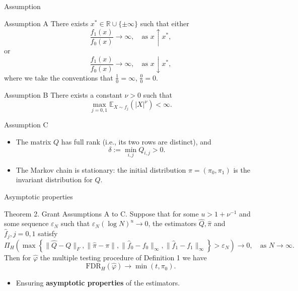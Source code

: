 \documentclass[10pt, aspectratio=169]{beamer}
\begin{document}
\begin{frame}{Assumption}
    \begin{assumpbox}{Assumption A}
        There exists \( x^* \in \mathbb{R} \cup \{\pm\infty\} \) such that either
        \[
        \frac{f_1(x)}{f_0(x)} \to \infty, \quad \text{as } x \uparrow x^*,
        \]
        or
        \[
        \frac{f_1(x)}{f_0(x)} \to \infty, \quad \text{as } x \downarrow x^*,
        \]
        where we take the conventions that \( \frac{1}{0} = \infty \), \( \frac{0}{0} = 0 \).
    \end{assumpbox}
\end{frame}
\begin{frame}
    \begin{assumpbox}{Assumption B}
        There exists a constant \( \nu > 0 \) such that
        \begin{equation*}
            \max_{j=0,1} \mathbb{E}_{X \sim f_j} (|X|^\nu) < \infty.
        \end{equation*}
    \end{assumpbox}
     \begin{assumpbox}{Assumption C}
        \begin{itemize}
            \item The matrix \( Q \) has full rank (i.e., its two rows are distinct), and 
            \[
            \delta := \min_{i,j} Q_{i,j} > 0.
            \]
            \item The Markov chain is stationary: the initial distribution \( \pi = (\pi_0, \pi_1) \) is the invariant distribution for \( Q \).
        \end{itemize}
    \end{assumpbox}  
\end{frame}
\begin{frame}{Asymptotic properties}
   \begin{mytheorembox}{Theorem 2.}
        Grant Assumptions A to C. Suppose that for some \( u > 1 + \nu^{-1} \) and some sequence
        \( \varepsilon_N \) such that \( \varepsilon_N (\log N)^u \to 0 \), the estimators \( \hat{Q}, \hat{\pi} \) and \( \hat{f}_j, j = 0,1 \) satisfy
        \[
        \Pi_H \left( \max \left\{ \|\hat{Q} - Q\|_F, \|\hat{\pi} - \pi\|, \|\hat{f}_0 - f_0\|_\infty, \|\hat{f}_1 - f_1\|_\infty \right\} > \varepsilon_N \right) \to 0, \quad \text{as } N \to \infty.
        \]
        Then for \( \hat{\varphi} \) the multiple testing procedure of Definition 1 we have
        \[
        \text{FDR}_H(\hat{\varphi}) \to \min(t, \pi_0).
        \]
   \end{mytheorembox}
   \vspace{2em}
    \begin{itemize}[label=\scalebox{0.5}{$\blacksquare$}]
        \item Ensuring \textbf{asymptotic properties} of the estimators.
    \end{itemize}
\end{frame}
\end{document}
